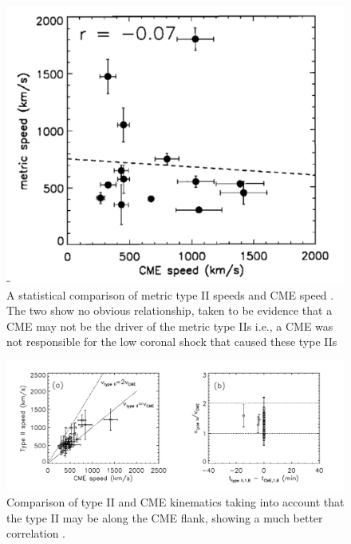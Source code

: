 \begin{figure}[t!]
\begin{center}
\includegraphics[trim=1cm 0cm 0cm 0cm, scale=0.25]{images/reiner2001.pdf}
\caption[Statistical comparison of CME and type II height-time kinematics]{A statistical comparison of metric type II speeds and CME speed \citet{reiner2001}. The two show no obvious relationship, taken to be evidence that a CME may not be the driver of the metric type IIs i.e., a CME was not responsible for the low coronal shock that caused these type IIs}
\label{fig:reiner}
\end{center}
\end{figure}
\begin{figure}[h!]
\begin{center}
\includegraphics[trim=0cm 1cm 0cm 1cm, scale=0.4]{images/mancuso_kins2}
\caption[Comparison of CME and type II height-time kinematics, corrected for CME flank shock assumption]{Comparison of type II and CME kinematics taking into account that the type II may be along the CME flank, showing a much better correlation \citep{mancuso2004}.}
\label{fig:mancuso_kins}
\end{center}
\end{figure}

